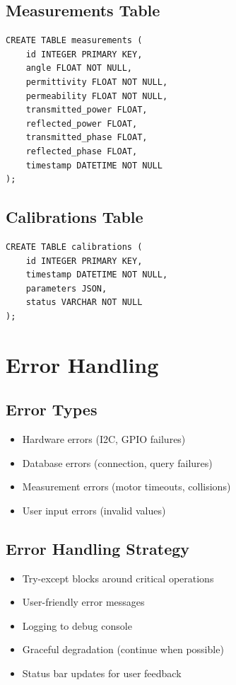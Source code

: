 \documentclass[11pt,a4paper]{article}
\begin{document}
\subsection{Measurements Table}
\begin{verbatim}
CREATE TABLE measurements (
    id INTEGER PRIMARY KEY,
    angle FLOAT NOT NULL,
    permittivity FLOAT NOT NULL,
    permeability FLOAT NOT NULL,
    transmitted_power FLOAT,
    reflected_power FLOAT,
    transmitted_phase FLOAT,
    reflected_phase FLOAT,
    timestamp DATETIME NOT NULL
);
\end{verbatim}

\subsection{Calibrations Table}
\begin{verbatim}
CREATE TABLE calibrations (
    id INTEGER PRIMARY KEY,
    timestamp DATETIME NOT NULL,
    parameters JSON,
    status VARCHAR NOT NULL
);
\end{verbatim}

\section{Error Handling}

\subsection{Error Types}
\begin{itemize}
    \item Hardware errors (I2C, GPIO failures)
    \item Database errors (connection, query failures)
    \item Measurement errors (motor timeouts, collisions)
    \item User input errors (invalid values)
\end{itemize}

\subsection{Error Handling Strategy}
\begin{itemize}
    \item Try-except blocks around critical operations
    \item User-friendly error messages
    \item Logging to debug console
    \item Graceful degradation (continue when possible)
    \item Status bar updates for user feedback
\end{itemize}
\end{document}
